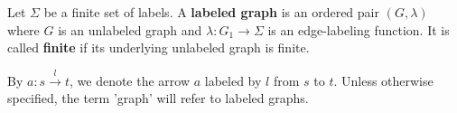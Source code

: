 \begin{definition}
    \label{def:graph}
    Let \(\Sigma\) be a finite set of labels. A \textbf{labeled graph} is an ordered pair \((G,\lambda)\) where \( G \) is an unlabeled graph and \( \lambda : G_1 \rightarrow \Sigma\) is an edge-labeling function. 
    It is called \textbf{finite} if its underlying unlabeled graph is finite.  
\end{definition}
By $a : s\overset{l}{\rightarrow} t$, we denote the arrow $a$ labeled by $l$ from $s$ to $t$. Unless otherwise specified, the term 'graph' will refer to labeled graphs.